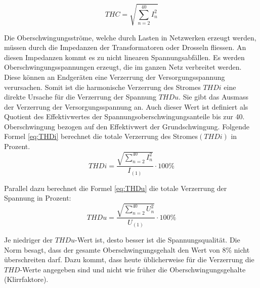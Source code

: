 \begin{equation}\label{eq:THC}
THC = {\sqrt{\sum_{n=2}^{40} I_n^2}}
\end{equation}



Die Oberschwingungsströme, welche durch Lasten in Netzwerken erzeugt werden, müssen durch die Impedanzen der Transformatoren oder Drosseln fliessen. An diesen Impedanzen kommt es zu nicht linearen Spannungsabfällen. Es werden Oberschwingungsspannungen erzeugt, die im ganzen Netz verbreitet werden. Diese können an Endgeräten eine Verzerrung der Versorgungsspannung verursachen. Somit ist die harmonische Verzerrung des Stromes $THDi$ eine direkte Ursache für die Verzerrung der Spannung $THDu$. Sie gibt das Ausmass der Verzerrung der Versorgungsspannung an. Auch dieser Wert ist definiert als Quotient des Effektivwertes der Spannungsoberschwingungsanteile bis zur 40. Oberschwingung bezogen auf den Effektivwert der Grundschwingung. 
Folgende Formel \ref{eq:THDi} berechnet die totale Verzerrung des Stromes$(THDi)$ in Prozent.
\begin{equation}\label{eq:THDi}
THDi = \frac{\sqrt{\sum_{n=2}^{40} I_n^2}}{I_{(1)}} \cdot 100 \%
\end{equation}

Parallel dazu berechnet die Formel \ref{eq:THDu} die totale Verzerrung der Spannung in Prozent:
\begin{equation}\label{eq:THDu}
THDu = \frac{\sqrt{\sum_{n=2}^{40} U_n^2}}{U_{(1)}} \cdot 100\%
\end{equation}


Je niedriger der $THDu$-Wert ist, desto besser ist die Spannungsqualität. Die Norm besagt, dass der gesamte Oberschwingungsgehalt den Wert von 8\% nicht überschreiten darf. Dazu kommt, dass heute üblicherweise für die Verzerrung die $THD$-Werte angegeben sind und nicht wie früher die Oberschwingungsgehalte (Klirrfaktore).\\







\newpage
